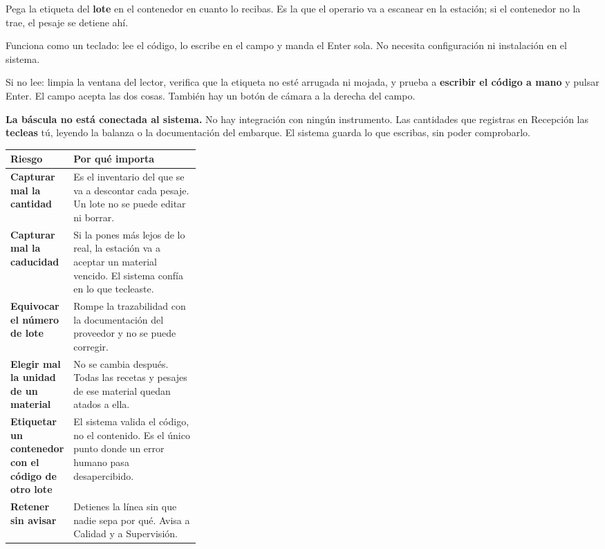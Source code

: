 \begin{cajaTip}[Etiquetado]
Pega la etiqueta del \textbf{lote} en el contenedor en cuanto lo recibas. Es la que
el operario va a escanear en la estación; si el contenedor no la trae, el pesaje se
detiene ahí.
\end{cajaTip}

\newpage
{}


Funciona como un teclado: lee el código, lo escribe en el campo y manda el Enter sola.
No necesita configuración ni instalación en el sistema.

Si no lee: limpia la ventana del lector, verifica que la etiqueta no esté arrugada ni
mojada, y prueba a \textbf{escribir el código a mano} y pulsar Enter. El campo acepta
las dos cosas. También hay un botón de cámara a la derecha del campo.


\begin{cajaNota}
\textbf{La báscula no está conectada al sistema.} No hay integración con ningún
instrumento. Las cantidades que registras en Recepción las \textbf{tecleas} tú, leyendo
la balanza o la documentación del embarque. El sistema guarda lo que escribas, sin
poder comprobarlo.
\end{cajaNota}

\newpage
{}

\begin{center}
\begin{tabularx}{\linewidth}{@{}p{0.32\linewidth} >{\raggedright\arraybackslash}X@{}}
\toprule
\textbf{Riesgo} & \textbf{Por qué importa} \\
\midrule
\textbf{Capturar mal la cantidad}   & Es el inventario del que se va a descontar cada pesaje. Un lote no se puede editar ni borrar. \\
\textbf{Capturar mal la caducidad}  & Si la pones más lejos de lo real, la estación va a aceptar un material vencido. El sistema confía en lo que tecleaste. \\
\textbf{Equivocar el número de lote} & Rompe la trazabilidad con la documentación del proveedor y no se puede corregir. \\
\textbf{Elegir mal la unidad de un material} & No se cambia después. Todas las recetas y pesajes de ese material quedan atados a ella. \\
\textbf{Etiquetar un contenedor con el código de otro lote} & El sistema valida el código, no el contenido. Es el único punto donde un error humano pasa desapercibido. \\
\textbf{Retener sin avisar}         & Detienes la línea sin que nadie sepa por qué. Avisa a Calidad y a Supervisión. \\
\bottomrule
\end{tabularx}
\end{center}

